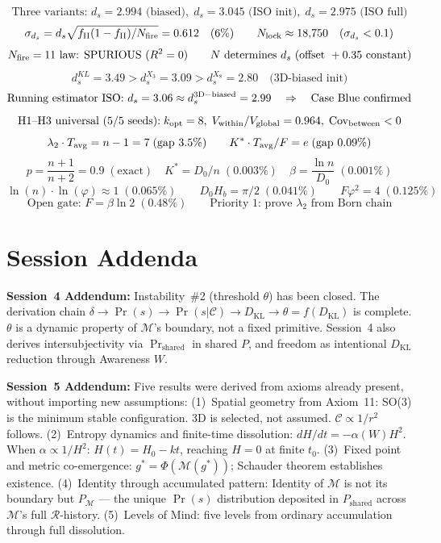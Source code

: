 \documentclass[12pt, a4paper]{article}
\begin{document}
\begin{keybox}[title={Extension: Geometry, Spectral, and Master System --- Parts X--XI (v15)}]
{\small
\[
  \text{Three variants: } d_s=2.994\text{ (biased)},\;d_s=3.045\text{ (ISO init)},\;d_s=2.975\text{ (ISO full)}
\]
\[
  \sigma_{d_s}=d_s\sqrt{f_{\rm II}(1-f_{\rm II})/N_{\rm fire}}=0.612 \quad(6\%) \qquad
  N_{\rm lock}\approx 18{,}750 \quad (\sigma_{d_s}<0.1)
\]
\[
  N_{\rm fire}=11\text{ law: SPURIOUS }(R^2=0) \qquad
  N\text{ determines }d_s\text{ (offset }+0.35\text{ constant)}
\]
\[
  d_s^{KL}=3.49 > d_s^{X_3}=3.09 > d_s^{X_8}=2.80 \quad\text{(3D-biased init)}
\]
\[
  \text{Running estimator ISO: }d_s=3.06\approx d_s^{\rm 3D-biased}=2.99
  \quad\Rightarrow\quad \text{Case Blue confirmed}
\]
\[
  \text{H1--H3 universal (5/5 seeds):}\;k_{\rm opt}=8,\;V_{\rm within}/V_{\rm global}=0.964,\;\mathrm{Cov}_{\rm between}<0
\]
\[
  \lambda_2\cdot T_{\rm avg}=n-1=7 \;(\text{gap }3.5\%)\qquad
  K^*\cdot T_{\rm avg}/F=e \;(\text{gap }0.09\%)
\]
\[
  p=\frac{n+1}{n+2}=0.9\;(\text{exact})\quad K^*=D_0/n\;(0.003\%)\quad
  \beta=\frac{\ln n}{D_0}\;(0.001\%)
\]
\[
  \ln(n)\cdot\ln(\varphi)\approx 1\;(0.065\%)\qquad
  D_0 H_b=\pi/2\;(0.041\%)\qquad F\varphi^2=4\;(0.125\%)
\]
\[
  \text{Open gate: }F=\beta\ln 2\;(0.48\%)\qquad
  \text{Priority 1: prove }\lambda_2\text{ from Born chain}
\]
}
\end{keybox}

\section*{Session Addenda}

\textbf{Session~4 Addendum:} Instability~\#2 (threshold $\theta$) has been closed. The
derivation chain $\delta \to \Pr(s) \to \Pr(s|\mathcal{C}) \to D_{\mathrm{KL}} \to
\theta = f(D_{\mathrm{KL}})$ is complete. $\theta$ is a dynamic property of $\mathcal{M}$'s
boundary, not a fixed primitive. Session~4 also derives intersubjectivity via
$\Pr_{\mathrm{shared}}$ in shared $P$, and freedom as intentional $D_{\mathrm{KL}}$
reduction through Awareness $W$.

\textbf{Session~5 Addendum:} Five results were derived from axioms already present, without
importing new assumptions:
(1)~Spatial geometry from Axiom~11: SO(3) is the minimum stable configuration. 3D is
selected, not assumed. $\mathcal{C} \propto 1/r^2$ follows.
(2)~Entropy dynamics and finite-time dissolution: $dH/dt = -\alpha(W)H^2$. When
$\alpha \propto 1/H^2$: $H(t) = H_0 - kt$, reaching $H = 0$ at finite $t_0$.
(3)~Fixed point and metric co-emergence: $g^* = \Phi(\mathcal{M}(g^*))$; Schauder
theorem establishes existence.
(4)~Identity through accumulated pattern: Identity of $\mathcal{M}$ is not its boundary
but $P_\mathcal{M}$ --- the unique $\Pr(s)$ distribution deposited in $P_{\mathrm{shared}}$
across $\mathcal{M}$'s full $\mathcal{R}$-history.
(5)~Levels of Mind: five levels from ordinary accumulation through full dissolution.
\end{document}
